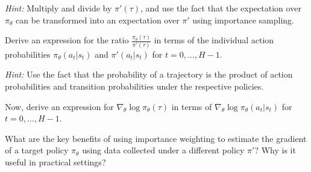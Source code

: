 \documentclass[11pt]{article}
\begin{document}
\noindent \textit{Hint:} Multiply and divide by $\pi'(\tau)$, and use the fact that the expectation over $\pi_{\theta}$ can be transformed into an expectation over $\pi'$ using importance sampling.
\newline

 Derive an expression for the ratio $\frac{\pi_{\theta}(\tau)}{\pi'(\tau)}$ in terms of the individual action probabilities $\pi_{\theta}(a_t|s_t)$ and $\pi'(a_t|s_t)$ for $t = 0, \dots, H-1$.
\newline

\noindent \textit{Hint:} Use the fact that the probability of a trajectory is the product of action probabilities and transition probabilities under the respective policies.
\newline

 Now, derive an expression for $\nabla_{\theta} \log \pi_{\theta}(\tau)$ in terms of $\nabla_{\theta} \log \pi_{\theta}(a_t|s_t)$ for $t = 0, \dots, H-1$.
\newline

What are the key benefits of using importance weighting to estimate the gradient of a target policy $\pi_\theta$ using data collected under a different policy $\pi'$? Why is it useful in practical settings?
\end{document}
